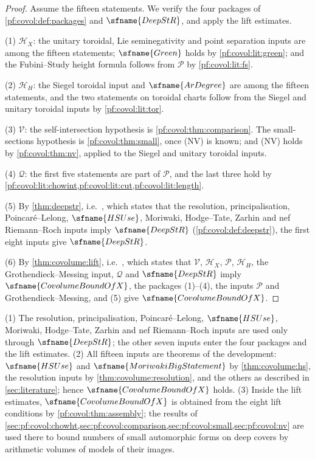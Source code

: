 \begin{proof}
Assume the fifteen statements. We verify the four packages of \cref{pf:covol:def:packages} and
$\sfname{DeepStR}$, and apply the lift estimates.

(1) $\mathcal H_X$: the unitary toroidal, Lie seminegativity and point separation inputs are among the
fifteen statements; $\sfname{Green}$ holds by \cref{pf:covol:lit:green}; and the Fubini--Study height
formula follows from $\mathcal P$ by \cref{pf:covol:lit:fs}.

(2) $\mathcal H_H$: the Siegel toroidal input and $\sfname{ArDegree}$ are among the fifteen statements,
and the two statements on toroidal charts follow from the Siegel and unitary toroidal inputs by
\cref{pf:covol:lit:tor}.

(3) $\mathcal V$: the self-intersection hypothesis is \cref{pf:covol:thm:comparison}. The small-sections
hypothesis is \cref{pf:covol:thm:small}, once (NV) is known; and (NV) holds by \cref{pf:covol:thm:nv},
applied to the Siegel and unitary toroidal inputs.

(4) $\mathcal Q$: the first five statements are part of $\mathcal P$, and the last three hold by
\cref{pf:covol:lit:chowint,pf:covol:lit:cut,pf:covol:lit:length}.

(5) By \cref{thm:deepstr}, i.e.\ , which states that the
resolution, principalisation, Poincar\'e--Lelong, $\sfname{HSUse}$, Moriwaki, Hodge--Tate, Zarhin and nef
Riemann--Roch inputs imply $\sfname{DeepStR}$ (\cref{pf:covol:def:deepstr}), the first eight inputs give
$\sfname{DeepStR}$.

(6) By \cref{thm:covolume:lift}, i.e.\ ,
which states that $\mathcal V$, $\mathcal H_X$, $\mathcal P$, $\mathcal H_H$, the Grothendieck--Messing input,
$\mathcal Q$ and $\sfname{DeepStR}$ imply $\sfname{CovolumeBoundOfX}$, the packages (1)--(4), the inputs
$\mathcal P$ and Grothendieck--Messing, and (5) give $\sfname{CovolumeBoundOfX}$.
\end{proof}

\begin{remark}\label{pf:covol:rem:inputs}
(1) The resolution, principalisation, Poincar\'e--Lelong, $\sfname{HSUse}$, Moriwaki, Hodge--Tate, Zarhin
and nef Riemann--Roch inputs are used only through $\sfname{DeepStR}$; the other seven inputs enter the
four packages and the lift estimates. (2) All fifteen inputs are theorems of the development:
$\sfname{HSUse}$ and $\sfname{MoriwakiBigStatement}$ by \cref{thm:covolume:hs}, the resolution inputs by
\cref{thm:covolume:resolution}, and the others as described in \cref{sec:literature}; hence
$\sfname{CovolumeBoundOfX}$ holds. (3) Inside the lift estimates, $\sfname{CovolumeBoundOfX}$ is obtained
from the eight lift conditions by \cref{pf:covol:thm:assembly}; the results of
\cref{sec:pf:covol:chowht,sec:pf:covol:comparison,sec:pf:covol:small,sec:pf:covol:nv} are used there to
bound numbers of small automorphic forms on deep covers by arithmetic volumes of models of their images.
\end{remark}

